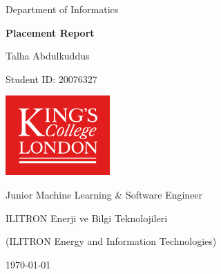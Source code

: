 \begin{titlepage}
    \begin{center}
        \small{}
        Department of Informatics

        \Huge{}
        \textbf{Placement Report}

        \vspace{25mm}
        \LARGE{}
        Talha Abdulkuddus

        \small{}
        Student ID\@: 20076327

        \vfill{}

        \includegraphics[width=40mm]{KCL-Logo} %

        \vfill{}

        \large{}
        Junior Machine Learning \& Software Engineer

        ILITRON Enerji ve Bilgi Teknolojileri

        \small{}
        (ILITRON Energy and Information Technologies)

        \vspace{15mm}
        \Large{}
        \today{}
    \end{center}
\end{titlepage}
